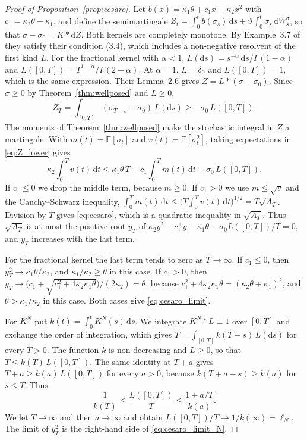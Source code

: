 \documentclass{rQUF2e}
\theoremstyle{plain}
\theoremstyle{definition}
\theoremstyle{remark}
\newcommand{\D}{\mathrm{d}}
\newcommand{\E}{\mathbb{E}}
\begin{document}
\begin{proof}[Proof of Proposition~\ref{prop:cesaro}] Let $b(x)=\kappa_1\theta+c_1x-\kappa_2x^2$ with $c_1=\kappa_2\theta-\kappa_1$, and define the semimartingale $Z_t=\int_0^tb(\sigma_s)\,\D s+\vartheta\int_0^t\sigma_s\,\D W^\sigma_s$, so that $\sigma-\sigma_0=K*\D Z$. Both kernels are completely monotone. By Example~3.7 of \citet{AbiJaberLarssonPulido2019} they satisfy their condition (3.4), which includes a non-negative resolvent of the first kind $L$. For the fractional kernel with $\alpha<1$, $L(\D s)=s^{-\alpha}\,\D s/\Gamma(1-\alpha)$ and $L([0,T])=T^{1-\alpha}/\Gamma(2-\alpha)$. At $\alpha=1$, $L=\delta_0$ and $L([0,T])=1$, which is the same expression. Their Lemma~2.6 gives $Z=L*(\sigma-\sigma_0)$. Since $\sigma\ge0$ by Theorem~\ref{thm:wellposed} and $L\ge0$,
\begin{equation}\label{eq:Z_lower}
Z_T=\int_{[0,T]}(\sigma_{T-s}-\sigma_0)\,L(\D s)\ge-\sigma_0\,L([0,T]) .
\end{equation}
The moments of Theorem~\ref{thm:wellposed} make the stochastic integral in $Z$ a martingale. With $m(t)=\E[\sigma_t]$ and $v(t)=\E[\sigma_t^2]$, taking expectations in \eqref{eq:Z_lower} gives
\begin{equation*}
\kappa_2\int_0^Tv(t)\,\D t\le\kappa_1\theta\,T+c_1\int_0^Tm(t)\,\D t+\sigma_0\,L([0,T]) .
\end{equation*}
If $c_1\le0$ we drop the middle term, because $m\ge0$. If $c_1>0$ we use $m\le\sqrt v$ and the Cauchy--Schwarz inequality, $\int_0^Tm(t)\,\D t\le\big(T\int_0^Tv(t)\,\D t\big)^{1/2}=T\sqrt{A_T}$. Division by $T$ gives \eqref{eq:cesaro}, which is a quadratic inequality in $\sqrt{A_T}$. Thus $\sqrt{A_T}$ is at most the positive root $y_T$ of $\kappa_2y^2-c_1^+y-\kappa_1\theta-\sigma_0L([0,T])/T=0$, and $y_T$ increases with the last term.

For the fractional kernel the last term tends to zero as $T\to\infty$. If $c_1\le0$, then $y_T^2\to\kappa_1\theta/\kappa_2$, and $\kappa_1/\kappa_2\ge\theta$ in this case. If $c_1>0$, then $y_T\to\big(c_1+\sqrt{c_1^2+4\kappa_2\kappa_1\theta}\big)/(2\kappa_2)=\theta$, because $c_1^2+4\kappa_2\kappa_1\theta=(\kappa_2\theta+\kappa_1)^2$, and $\theta>\kappa_1/\kappa_2$ in this case. Both cases give \eqref{eq:cesaro_limit}.

For $K^N$ put $k(t)=\int_0^tK^N(s)\,\D s$. We integrate $K^N*L\equiv1$ over $[0,T]$ and exchange the order of integration, which gives $T=\int_{[0,T]}k(T-s)\,L(\D s)$ for every $T>0$. The function $k$ is non-decreasing and $L\ge0$, so that $T\le k(T)\,L([0,T])$. The same identity at $T+a$ gives $T+a\ge k(a)\,L([0,T])$ for every $a>0$, because $k(T+a-s)\ge k(a)$ for $s\le T$. Thus
\begin{equation*}
\frac{1}{k(T)}\le\frac{L([0,T])}{T}\le\frac{1+a/T}{k(a)} .
\end{equation*}
We let $T\to\infty$ and then $a\to\infty$ and obtain $L([0,T])/T\to1/k(\infty)=\ell_N$. The limit of $y_T^2$ is the right-hand side of \eqref{eq:cesaro_limit_N}. \end{proof}
\end{document}
